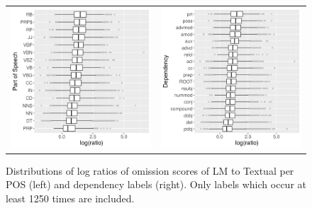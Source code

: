 \begin{figure}[t]
  \centering
  \hspace*{-0.2in}
  \setlength{\tabcolsep}{0pt}
  \begin{tabular}{cc}
  \includegraphics[scale=0.45]{chapters/COLI/imaginet-omission-quotient-pos-boxplot.png} &
  \includegraphics[scale=0.45]{chapters/COLI/imaginet-omission-quotient-dep-boxplot.png} \\
  \end{tabular}
  \caption{Distributions of log ratios of omission scores of {\sc LM} to {\sc Textual} per
    POS (left) and dependency labels (right). Only labels which occur at least 1250 times are included.}
\label{fig:omission-imaginet-quotient}
\end{figure}


